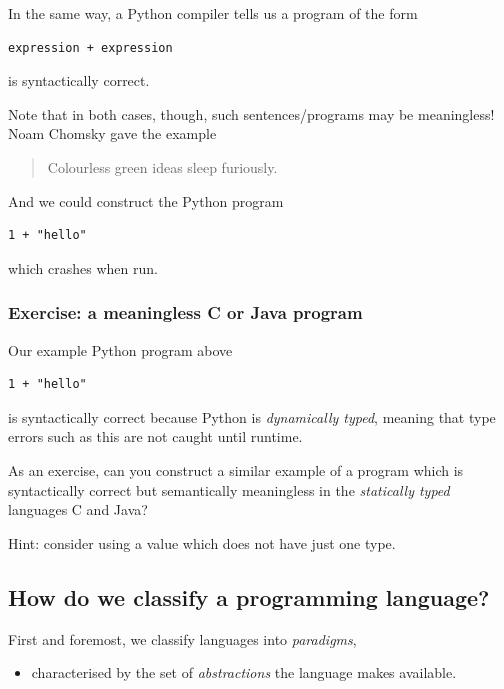 \documentclass[11pt]{article}
\theoremstyle{definition}
\begin{document}
In the same way, a Python compiler tells us a program of the form
\begin{verbatim}
expression + expression
\end{verbatim}
is syntactically correct.

Note that in both cases, though, such sentences/programs
may be meaningless!
Noam Chomsky gave the example
\begin{quote}
Colourless green ideas sleep furiously.
\end{quote}

And we could construct the Python program
\begin{verbatim}
1 + "hello"
\end{verbatim}
which crashes when run.

\subsubsection{Exercise: a meaningless C or Java program}
\label{sec:org0adb9e7}

Our example Python program above
\begin{verbatim}
1 + "hello"
\end{verbatim}
is syntactically correct because Python is \emph{dynamically typed},
meaning that type errors such as this are not caught until runtime.

As an exercise, can you construct a similar example
of a program which is syntactically correct
but semantically meaningless in the \emph{statically typed} languages
C and Java?

Hint: consider using a value which does not have just one type.

\subsection{How do we classify a programming language?}
\label{sec:orge8c69ff}

First and foremost, we classify languages into \emph{paradigms},
\begin{itemize}
\item characterised by the set of \emph{abstractions} the language makes available.
\end{itemize}
\end{document}
